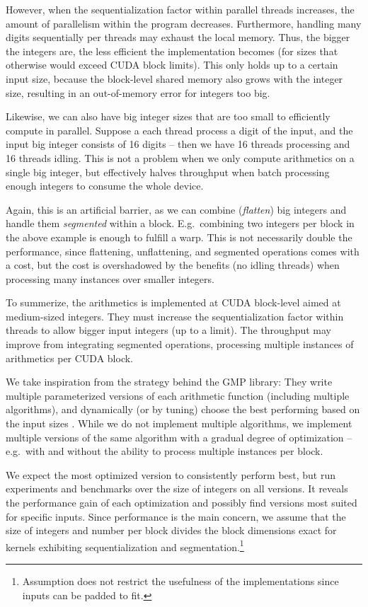 However, when the sequentialization factor within parallel threads increases,
the amount of parallelism within the program decreases. Furthermore, handling
many digits sequentially per threads may exhaust the local memory. Thus, the
bigger the integers are, the less efficient the implementation becomes (for
sizes that otherwise would exceed CUDA block limits). This only holds up to a
certain input size, because the block-level shared memory also grows with the
integer size, resulting in an out-of-memory error for integers too big.

Likewise, we can also have big integer sizes that are too small to efficiently
compute in parallel. Suppose a each thread process a digit of the input, and the
input big integer consists of 16 digits -- then we have 16 threads processing and
16 threads idling. This is not a problem when we only compute arithmetics on a
single big integer, but effectively halves throughput when batch processing
enough integers to consume the whole device.

Again, this is an artificial barrier, as we can combine (\textit{flatten}) big
integers and handle them \textit{segmented} within a block. E.g.\ combining two
integers per block in the above example is enough to fulfill a warp. This is not
necessarily double the performance, since flattening, unflattening, and
segmented operations comes with a cost, but the cost is overshadowed by the
benefits (no idling threads) when processing many instances over smaller
integers.\newline

To summerize, the arithmetics is implemented at CUDA block-level aimed at
medium-sized integers. They must increase the sequentialization factor within
threads to allow bigger input integers (up to a limit). The throughput may
improve from integrating segmented operations, processing multiple instances of
arithmetics per CUDA block.

We take inspiration from the strategy behind the GMP library: They write
multiple parameterized versions of each arithmetic function (including multiple
algorithms), and dynamically (or by tuning) choose the best performing based on
the input sizes \cite{GMP}. While we do not implement multiple algorithms, we
implement multiple versions of the same algorithm with a gradual degree of
optimization -- e.g.\ with and without the ability to process multiple instances
per block.

We expect the most optimized version to consistently perform best, but run
experiments and benchmarks over the size of integers on all versions. It reveals
the performance gain of each optimization and possibly find versions most suited
for specific inputs. Since performance is the main concern, we assume that the
size of integers and number per block divides the block dimensions exact for
kernels exhibiting sequentialization and segmentation.\footnote{Assumption does
  not restrict the usefulness of the implementations since inputs can be padded
  to fit.}


